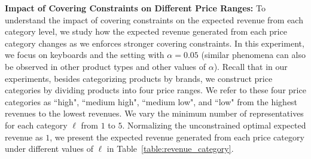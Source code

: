 \documentclass[msom,non-blindrev]{informs3} %
\theoremstyle{definition}
\begin{document}
{  

\noindent\textbf{Impact of Covering Constraints on Different Price Ranges:} To understand the impact of covering constraints on the expected revenue from each category level, we study how the expected revenue generated from each price category changes as we enforces stronger covering constraints. In this experiment, we focus on keyboards and the setting with $\alpha=0.05$ (similar phenomena can also be observed in other product types and other values of $\alpha$). Recall that in our experiments, besides categorizing products by brands, we construct price categories by dividing products into four price ranges. We refer to these four price categories as ``high", ``medium high", ``medium low", and ``low" from the highest revenues to the lowest revenues. We vary the minimum number of representatives for each category $\ell$ from $1$ to $5$. Normalizing the unconstrained optimal expected revenue as $1$, we present the expected revenue generated from each price category under different values of $\ell$ in Table~\ref{table:revenue_category}.

\begin{table}[!ht]
\end{table}

}
\end{document}
